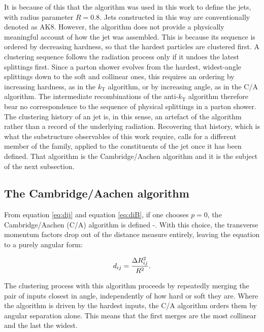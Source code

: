 It is because of this that the \antikt{} algorithm was used in this work to define
the jets, with radius parameter $R = 0.8$. Jets constructed in this way are
conventionally denoted as AK8. However, the algorithm does not provide a physically
meaningful account of how the jet was assembled. This is because its sequence is ordered by decreasing hardness,
so that the hardest particles are clustered first. A clustering
sequence follows the radiation process only if it undoes the
latest splittings first. Since a parton shower evolves from the
hardest, widest-angle splittings down to the soft and collinear
ones, this requires an ordering by increasing hardness, as in the
$k_\mathrm{T}$ algorithm, or by increasing angle, as in the C/A
algorithm. The intermediate recombinations of the
anti-$k_\mathrm{T}$ algorithm therefore bear no correspondence
to the sequence of physical splittings in a parton shower.
The clustering history of an \antikt{} jet is, in this sense, an
artefact of the algorithm rather than a record of the underlying radiation.
Recovering that history, which is what the substructure observables of this work
require, calls for a different member of the family, applied to the constituents
of the jet once it has been defined. That algorithm is the Cambridge/Aachen algorithm
and it is the subject of the next subsection.

\subsection{The Cambridge/Aachen algorithm}
\label{sec:ca}

From equation \ref{eq:dij} and equation \ref{eq:diB}, if one chooses $p=0$, the Cambridge/Aachen (C/A)
algorithm is defined \cite{Dokshitzer_1997}-\cite{wobisch1999hadronizationcorrectionsjetcross}.
With this choice, the transverse momentum factors drop out of the distance measure entirely,
leaving the equation to a purely angular form:

\begin{equation}
  d_{ij} = \frac{\Delta R_{ij}^2}{R^2}.
  \label{eq:ca-distance}
\end{equation}

The clustering process with this algorithm proceeds by repeatedly merging the pair of inputs
closest in angle, independently of how hard or soft they are. Where the \antikt{}
algorithm is driven by the hardest inputs, the C/A algorithm orders them by angular
separation alone. This means that the first merges are the most collinear and the 
last the widest.

